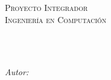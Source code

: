 \documentclass[
11pt, %
spanish, %
singlespacing, %
headsepline, %
]{MastersDoctoralThesis} %
\begin{document}
\frontmatter %

\pagestyle{plain} %


\begin{titlepage}
	\begin{center}
				
				
		\vspace*{.06\textheight}
		{\scshape\LARGE \univname\par}\vspace{0.5cm} %
		{\scshape\LARGE \facname\par}\vspace{1.5cm}
		\textsc{\Large Proyecto Integrador}\\[0.5cm] %
		\textsc{\Large Ingeniería en Computación}\\[0.5cm]
				
		\HRule \\[0.4cm] %
		{\huge \bfseries \ttitle\par}\vspace{0.4cm} %
		\HRule \\[1.5cm] %
				 
		\begin{minipage}[t]{0.5\textwidth}
			\begin{flushleft} \large
				\emph{Autor:}\\
				\authornameA \\ %
				\matriculanameA \\
				\emailnameA
				\\~\\
				

\end{flushleft}
\end{minipage}
\end{center}
\end{titlepage}
\end{document}
